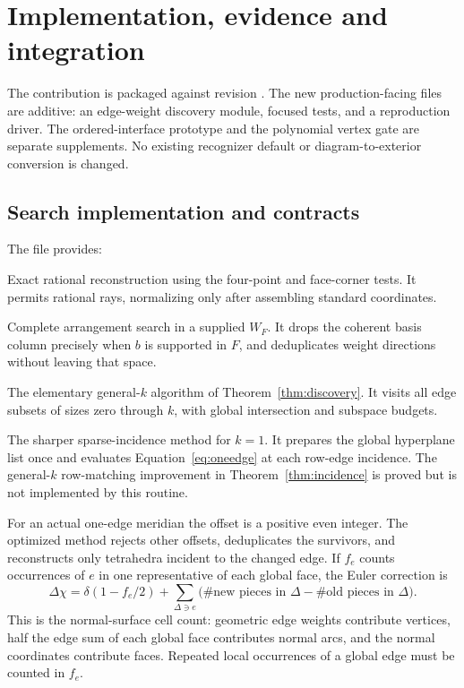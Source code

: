 \section{Implementation, evidence and integration}
\label{sec:implementation}

The contribution is packaged against revision
. The new production-facing
files are additive: an edge-weight discovery module, focused tests, and a
reproduction driver. The ordered-interface prototype and the polynomial
vertex gate are separate supplements. No existing recognizer default or
diagram-to-exterior conversion is changed.

\subsection{Search implementation and contracts}

The file  provides:
\begin{description}[style=nextline]
\item[\texttt{local\_coordinates\_from\_weights}]
Exact rational reconstruction using the four-point and face-corner tests.
It permits rational rays, normalizing only after assembling standard
coordinates.
\item[\texttt{discover\_in\_weight\_subspace}]
Complete arrangement search in a supplied $W_F$. It drops the coherent
basis column precisely when $b$ is supported in $F$, and deduplicates
weight directions without leaving that space.
\item[\texttt{weight\_defect\_search}]
The elementary general-$k$ algorithm of Theorem~\ref{thm:discovery}.
It visits all edge subsets of sizes zero through $k$, with global
intersection and subspace budgets.
\item[\texttt{one\_edge\_defect\_search}]
The sharper sparse-incidence method for $k=1$. It prepares the global
hyperplane list once and evaluates Equation~\eqref{eq:oneedge} at each
row-edge incidence. The general-$k$ row-matching improvement in
Theorem~\ref{thm:incidence} is proved but is not implemented by this routine.
\end{description}

For an actual one-edge meridian the offset is a positive even integer.
The optimized method rejects other offsets, deduplicates the survivors,
and reconstructs only tetrahedra incident to the changed edge. If $f_e$
counts occurrences of $e$ in one representative of each global face,
the Euler correction is
\[
 \Delta\chi=\delta(1-f_e/2)
       +\sum_{\Delta\ni e}
           \bigl(\#\text{new pieces in }\Delta
                -\#\text{old pieces in }\Delta\bigr).
\]
This is the normal-surface cell count: geometric edge weights contribute
vertices, half the edge sum of each global face contributes normal arcs,
and the normal coordinates contribute faces. Repeated local occurrences
of a global edge must be counted in $f_e$.

